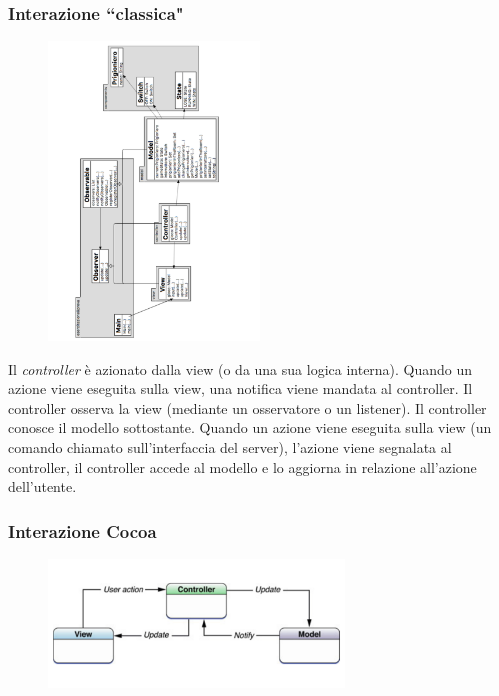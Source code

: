\documentclass{beamer}
\begin{document}
\begin{frame}
\frametitle{Interazione ``classica"}
\begin{figure}
\centering
\includegraphics[width=0.5\textwidth]{Img/MVC.pdf}
\end{figure}
Il \emph{controller} \`e azionato dalla view (o da una sua logica interna). Quando un azione viene eseguita sulla view, una notifica viene mandata al controller. Il controller osserva la view (mediante un osservatore o un listener). Il controller conosce il modello sottostante. Quando un azione viene eseguita sulla view (un comando chiamato sull'interfaccia del server), l'azione viene segnalata al controller, il controller accede al modello e lo aggiorna in relazione all'azione dell'utente.
\end{frame}

\begin{frame}
\frametitle{Interazione Cocoa}
\begin{figure}
\centering
\includegraphics[width=0.7\textwidth]{Img/MVCCocoa.pdf}
\end{figure}
\end{frame}
\end{document}
